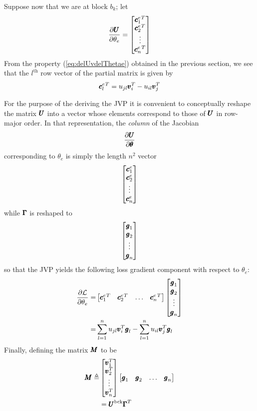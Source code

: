 \documentclass[superscriptaddress,floatfix]{article}
\begin{document}
Suppose now that we are at block $b_k$; let
\[
\frac{\partial{\pmb{U}}}{\partial\theta_e} = \begin{bmatrix}
  {\pmb{c}}^e_1{}^T \\
  {\pmb{c}}^e_2{}^T \\
  \vdots \\
  {\pmb{c}}^e_n{}^T
  \end{bmatrix}
\]
From the property (\ref{eq:delUvdelThetae}) obtained in the previous
section, we see that the $l^{\textrm{th}}$ row vector of the partial matrix is given
by
\[
{\pmb{c}}_l^e{}^T = u_{jl} {\pmb{v}}_i^T - u_{il}{\pmb{v}}_j^T
\]

For the purpose of the deriving the JVP it is convenient to conceptually
reshape the matrix ${\pmb{U}}$ into a vector whose elements correspond
to those of ${\pmb{U}}$ in row-major order. In that representation, the
\emph{column} of the Jacobian
\[
\frac{\partial{\pmb{U}}}{\partial{\pmb{\theta}}}
\]
corresponding to $\theta_e$ is simply the length $n^2$ vector
\[
\begin{bmatrix}
  {\pmb{c}}^e_1 \\
  {\pmb{c}}^e_2 \\
  \vdots \\
  {\pmb{c}}^e_n
\end{bmatrix}
\]
while ${\pmb{\Gamma}}$ is reshaped to
\[
\begin{bmatrix}
  {\pmb{g}}_1 \\
  {\pmb{g}}_2 \\
  \vdots \\
  {\pmb{g}}_n
\end{bmatrix}
\]
so that the JVP yields the following loss gradient component with
respect to $\theta_e$:
\begin{align}
\frac{\partial\mathcal{L}}{\partial\theta_e} = & \begin{bmatrix}
  {\pmb{c}}^e_1{}^T &
  {\pmb{c}}^e_2{}^T &
  \hdots &
  {\pmb{c}}^e_n{}^T
\end{bmatrix}
\begin{bmatrix}
  {\pmb{g}}_1 \\
  {\pmb{g}}_2 \\
  \vdots \\
  {\pmb{g}}_n
\end{bmatrix} \nonumber \\
  = & \sum_{l=1}^nu_{jl}{\pmb{v}}_i^T{\pmb{g}}_l  - \sum_{l=1}^nu_{il}{\pmb{v}}_j^T{\pmb{g}}_l
      \label{eq:delLdelThetae1}
\end{align}
Finally, defining the matrix ${\pmb{M}}$ to be
\begin{align}
  {\pmb{M}} \triangleq & \begin{bmatrix}
    {\pmb{v}}_1^T \\
    {\pmb{v}}_2^T \\
    \vdots \\
    {\pmb{v}}_n^T
  \end{bmatrix}
  \begin{bmatrix}
    {\pmb{g}}_1 & {\pmb{g}}_2 & \hdots & {\pmb{g}}_n 
  \end{bmatrix} \nonumber \\
  & = {\pmb{U}}^{\textrm{bck}} {\pmb{\Gamma}}^T
    \label{eq:MDef}
\end{align}
\end{document}
